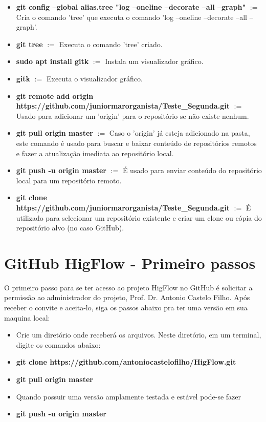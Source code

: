 \documentclass[12pt]{article}
\begin{document}
\begin{itemize}
	\item \textbf{git config --global alias.tree "log --oneline --decorate --all --graph"} $:=$ Cria o comando 'tree' que executa o comando 'log --oneline --decorate --all --graph'.
	
	\item \textbf{git tree} $:=$ Executa o comando 'tree' criado.
	
	\item \textbf{sudo apt install gitk} $:=$ Instala um visualizador gráfico.
	
	\item \textbf{gitk} $:=$ Executa o visualizador gráfico.
	
	\item \textbf{git remote add origin https://github.com/juniormarorganista/Teste\_Segunda.git} $:=$ Usado para adicionar um 'origin' para o repositório se não existe nenhum.
	
	\item \textbf{git pull origin master} $:=$ Caso o 'origin' já esteja adicionado na pasta, este comando é usado para buscar e baixar conteúdo de repositórios remotos e fazer a atualização imediata ao repositório local.
	
	\item \textbf{git push -u origin master} $:=$ É usado para enviar conteúdo do repositório local para um repositório remoto.
	
	\item \textbf{git clone https://github.com/juniormarorganista/Teste\_Segunda.git} $:=$ É utilizado para selecionar um repositório existente e criar um clone ou cópia do repositório alvo (no caso GitHub).
	
\end{itemize}

\section{GitHub HigFlow - Primeiro passos}\label{sec:github_higflow}

O primeiro passo para se ter acesso ao projeto HigFlow no GitHub é solicitar a permissão ao administrador do projeto, Prof. Dr. Antonio Castelo Filho. Após receber o convite e aceita-lo, siga os passos abaixo pra ter uma versão em sua maquina local:

\begin{itemize}
	\item Crie um diretório onde receberá os arquivos. Neste diretório, em um terminal, digite os comandos abaixo:
	
	\item \textbf{git clone https://github.com/antoniocastelofilho/HigFlow.git}
	
	\item \textbf{git pull origin master}
	
	\item Quando possuir uma versão amplamente testada e estável pode-se fazer 
	
	\item \textbf{git push -u origin master}
	
\end{itemize}

%
%
\end{document}
